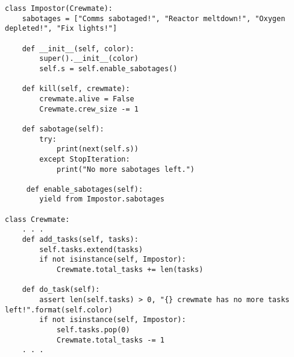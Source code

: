 \begin{solution}
\begin{lstlisting}
class Impostor(Crewmate):
    sabotages = ["Comms sabotaged!", "Reactor meltdown!", "Oxygen depleted!", "Fix lights!"]
    
    def __init__(self, color):
        super().__init__(color)
        self.s = self.enable_sabotages()
    
    def kill(self, crewmate):
        crewmate.alive = False
        Crewmate.crew_size -= 1
    
    def sabotage(self):
        try:
            print(next(self.s))
        except StopIteration:
            print("No more sabotages left.")
     
     def enable_sabotages(self):
     	yield from Impostor.sabotages

class Crewmate:
    . . .
    def add_tasks(self, tasks):
        self.tasks.extend(tasks)
        if not isinstance(self, Impostor):
            Crewmate.total_tasks += len(tasks)
    
    def do_task(self):
        assert len(self.tasks) > 0, "{} crewmate has no more tasks left!".format(self.color)
        if not isinstance(self, Impostor):
            self.tasks.pop(0)
            Crewmate.total_tasks -= 1
    . . .
\end{lstlisting}
\end{solution}


